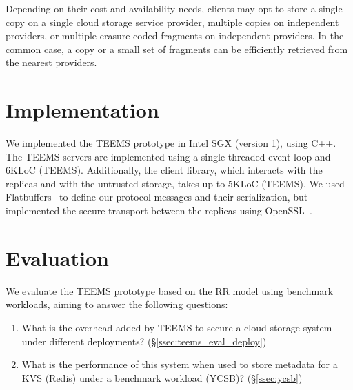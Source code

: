 Depending on their cost and availability needs, clients may opt to
store a single copy on a single cloud storage service provider,
multiple copies on independent providers, or multiple erasure coded
fragments on independent providers. In the common case, a copy or a
small set of fragments can be efficiently retrieved from the nearest
providers.


\section{Implementation}\label{sec:teems_impl}

We implemented the \ac{TEEMS} prototype in Intel SGX (version 1),
using C++. The \ac{TEEMS} servers are implemented using a
single-threaded event loop and 6KLoC (\ac{TEEMS}). Additionally,
the client library, which interacts with the replicas and with
the untrusted storage, takes up to 5KLoC (\ac{TEEMS}). We used
Flatbuffers~\cite{flatbuffers} to define our protocol messages
and their serialization, but implemented the secure transport
between the replicas using OpenSSL~\cite{openssl}.


\section{Evaluation}\label{sec:teems_eval}


We evaluate the \ac{TEEMS} prototype based on the \ac{RR} model
using benchmark workloads, aiming to answer the following questions:

\begin{enumerate}
    \item What is the overhead added by \ac{TEEMS} to secure a cloud storage system under different
      deployments?  (\S\ref{ssec:teems_eval_deploy})
    \item What is the performance of this system  when used to store
      metadata for a \ac{KVS} (Redis) under a benchmark
        workload (\ac{YCSB})?
      (\S\ref{ssec:ycsb})
\end{enumerate}

